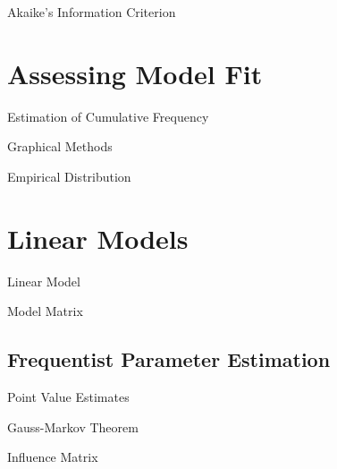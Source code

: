 \documentclass[11pt,a4paper]{article}
\begin{document}
\begin{definition}{Akaike's Information Criterion}

\end{definition}

\section{Assessing Model Fit}

\begin{remark}{Estimation of Cumulative Frequency}

\end{remark}

\begin{remark}{Graphical Methods}

\end{remark}

\begin{definition}{Empirical Distribution}

\end{definition}

\section{Linear Models}

\begin{definition}{Linear Model}

\end{definition}

\begin{definition}{Model Matrix}

\end{definition}

\subsection{Frequentist Parameter Estimation}

\begin{definition}{Point Value Estimates}
\end{definition}

\begin{theorem}{Gauss-Markov Theorem}

\end{theorem}

\begin{definition}{Influence Matrix}

\end{definition}
\end{document}
